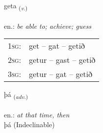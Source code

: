 \documentclass[frontgrid, backgrid]{flacards}\usepackage[]{graphicx}\usepackage[]{xcolor}
\begin{document}
\renewcommand{\blhead}{\vskip5pt {\small\bfseries\footnotesize Sagnorð | Verb }}
\renewcommand{\bcfoot}{\vskip5pt \hspace{2pt}{\small\bfseries\footnotesize 1K}}


{geta \small{\textsubscript{(\textit{v.})}} \\[1ex] %
\textphonetic{[cɛːta]} \\
en.: \emph{be able to; achieve; guess} \\  [2ex]
\renewcommand*{\arraystretch}{0.8}
\begin{tabular}{p{1cm}l}
\textsc{1sg}: & get -- gat -- getið \\ 
\textsc{2sg}: & getur -- gast -- getið \\ 
\textsc{3sg}: & getur -- gat -- getið \\ 
\end{tabular}
}


\renewcommand{\flhead}{\vskip5pt \fboxsep=0pt {\small\bfseries\footnotesize Atviksorð | Adverb}}
\renewcommand{\fcfoot}{\vskip5pt \fboxsep=0pt \hspace{2pt}{\small\bfseries\footnotesize 1K}}

\renewcommand{\blhead}{\vskip5pt {\small\bfseries\footnotesize Atviksorð | Adverb }}
\renewcommand{\bcfoot}{\vskip5pt \hspace{2pt}{\small\bfseries\footnotesize 1K}}


{þá \small{\textsubscript{(\textit{adv.})}} \\[1ex]
\textphonetic{[θauː]} \\
en.: \emph{at that time, then} \\  [2ex]
þá (Indeclinable)}

\renewcommand{\flhead}{\vskip5pt \fboxsep=0pt {\small\bfseries\footnotesize Sagnorð | Verb}}
\renewcommand{\fcfoot}{\vskip5pt \fboxsep=0pt \hspace{2pt}{\small\bfseries\footnotesize 1K}}

\renewcommand{\blhead}{\vskip5pt {\small\bfseries\footnotesize Sagnorð | Verb }}
\renewcommand{\bcfoot}{\vskip5pt \hspace{2pt}{\small\bfseries\footnotesize 1K}}
\end{document}
